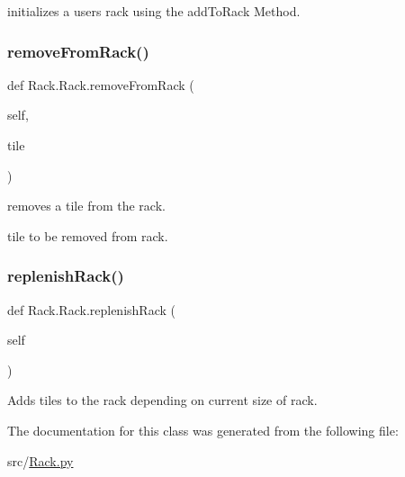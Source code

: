 initializes a users rack using the add\+To\+Rack Method. 

\mbox{\label{class_rack_1_1_rack_a67086c96db03aae607ab3c8cd9d708af}} 
\subsubsection{\texorpdfstring{remove\+From\+Rack()}{removeFromRack()}}
{\footnotesize\ttfamily def Rack.\+Rack.\+remove\+From\+Rack (\begin{DoxyParamCaption}\item[{}]{self,  }\item[{}]{tile }\end{DoxyParamCaption})}



removes a tile from the rack. 

tile to be removed from rack. \mbox{\label{class_rack_1_1_rack_af35674a6e6b76c0809f7175eb126c045}} 
\subsubsection{\texorpdfstring{replenish\+Rack()}{replenishRack()}}
{\footnotesize\ttfamily def Rack.\+Rack.\+replenish\+Rack (\begin{DoxyParamCaption}\item[{}]{self }\end{DoxyParamCaption})}



Adds tiles to the rack depending on current size of rack. 



The documentation for this class was generated from the following file\+:\begin{DoxyCompactItemize}
\item 
src/\hyperlink{_rack_8py}{Rack.\+py}\end{DoxyCompactItemize}
